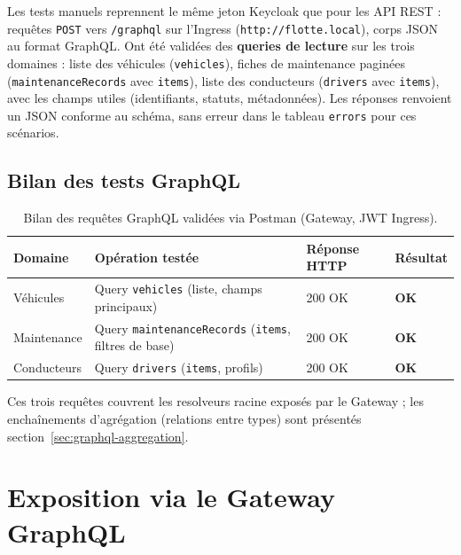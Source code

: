 \documentclass[12pt,a4paper]{article}
\begin{document}
Les tests manuels reprennent le même jeton Keycloak que pour les API REST : requêtes \texttt{POST} vers \texttt{/graphql} sur l'Ingress (\texttt{http://flotte.local}), corps JSON au format GraphQL. Ont été validées des \textbf{queries de lecture} sur les trois domaines : liste des véhicules (\texttt{vehicles}), fiches de maintenance paginées (\texttt{maintenanceRecords} avec \texttt{items}), liste des conducteurs (\texttt{drivers} avec \texttt{items}), avec les champs utiles (identifiants, statuts, métadonnées). Les réponses renvoient un JSON conforme au schéma, sans erreur dans le tableau \texttt{errors} pour ces scénarios.

\subsection{Bilan des tests GraphQL}

\begin{table}[H]
\centering
\small
\begin{tabular}{|l|l|l|l|}
  \hline
  \rowcolor{primary!15}
  \textbf{Domaine} & \textbf{Opération testée} & \textbf{Réponse HTTP} & \textbf{Résultat} \\
  \hline
  Véhicules & Query \texttt{vehicles} (liste, champs principaux) & 200 OK & \textcolor{success}{\textbf{OK}} \\
  \hline
  Maintenance & Query \texttt{maintenanceRecords} (\texttt{items}, filtres de base) & 200 OK & \textcolor{success}{\textbf{OK}} \\
  \hline
  Conducteurs & Query \texttt{drivers} (\texttt{items}, profils) & 200 OK & \textcolor{success}{\textbf{OK}} \\
  \hline
\end{tabular}
\caption{Bilan des requêtes GraphQL validées via Postman (Gateway, JWT Ingress).}
\label{tab:bilan-graphql}
\end{table}

Ces trois requêtes couvrent les resolveurs racine exposés par le Gateway ; les enchaînements d'agrégation (relations entre types) sont présentés section~\ref{sec:graphql-aggregation}.

\newpage

\section{Exposition via le Gateway GraphQL}
\end{document}
